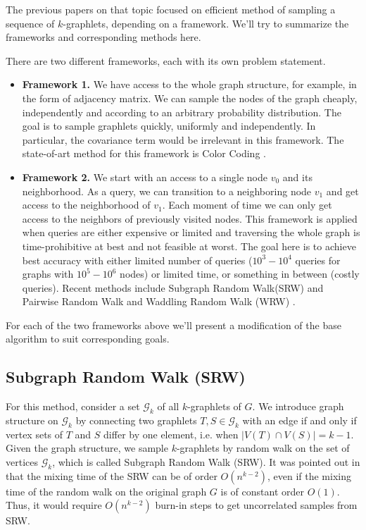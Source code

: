 	The previous papers on that topic focused on efficient method of sampling a sequence of $k$-graphlets, depending on a framework.
	We'll try to summarize the frameworks and corresponding methods here.
	
	There are two different frameworks, each with its own problem statement.
	\begin{itemize}
		\item \textbf{Framework 1.} We have access to the whole graph structure, for example, in the form of adjacency matrix. 
		We can sample the nodes of the graph cheaply, independently and according to an arbitrary probability distribution.
		The goal is to sample graphlets quickly, uniformly and independently.
		In particular, the covariance term would be irrelevant in this framework.
		The state-of-art method for this framework is Color Coding \cite{Bressan2017colourcoding}.

		\item \textbf{Framework 2.} We start with an access to a single node $v_0$ and its 
		neighborhood. As a query, we can transition to a neighboring node $v_1$ and get access to the neighborhood of $v_1$.
		Each moment of time we can only get access to the neighbors of previously visited nodes. 
		This framework is applied when queries are either expensive or limited and traversing the whole graph is time-prohibitive at best and not feasible at worst. 
		The goal here is to achieve best accuracy with either limited number of queries ($10^3-10^4$ queries for graphs with $10^5-10^6$ nodes) or limited time, or something in between (costly queries).
		Recent methods include Subgraph Random Walk(SRW) and Pairwise Random Walk \cite{Wang2014psrw} and Waddling Random Walk (WRW) \cite{Han2016waddling}.
	\end{itemize}
	
	For each of the two frameworks above we'll present a modification of the base algorithm
	to suit corresponding goals.
	
	\subsection{Subgraph Random Walk (SRW)}
	For this method, consider a set $\mathcal{G}_k$ of all $k$-graphlets of $G$.
	We introduce graph structure on $\mathcal{G}_k$ by connecting two graphlets $T,S \in \mathcal{G}_k$ with an edge if and only if vertex sets of $T$ and $S$ differ by one element, i.e. when $|V(T) \cap V(S)| = k-1$.
	Given the graph structure, we sample $k$-graphlets by random walk on the set of vertices $\mathcal{G}_k$, which is called Subgraph Random Walk (SRW).
	It was pointed out in \cite{Bressan2017colourcoding} that the mixing time of the SRW can be of order $O(n^{k-2})$, even if the mixing time of the random walk on the original graph $G$ is of constant order $O(1)$.
	Thus, it would require $O(n^{k-2})$ burn-in steps to get uncorrelated samples from SRW.
		
